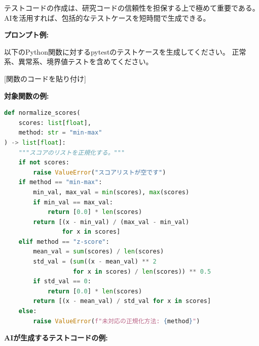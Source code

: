 テストコードの作成は、研究コードの信頼性を担保する上で極めて重要である。AIを活用すれば、包括的なテストケースを短時間で生成できる。

\textbf{プロンプト例:}

\begin{promptbox}
以下のPython関数に対するpytestのテストケースを生成してください。
正常系、異常系、境界値テストを含めてください。

{[}関数のコードを貼り付け]
\end{promptbox}

\textbf{対象関数の例:}

\begin{lstlisting}[language=Python]
def normalize_scores(
    scores: list[float],
    method: str = "min-max"
) -> list[float]:
    """スコアのリストを正規化する。"""
    if not scores:
        raise ValueError("スコアリストが空です")
    if method == "min-max":
        min_val, max_val = min(scores), max(scores)
        if min_val == max_val:
            return [0.0] * len(scores)
        return [(x - min_val) / (max_val - min_val)
                for x in scores]
    elif method == "z-score":
        mean_val = sum(scores) / len(scores)
        std_val = (sum((x - mean_val) ** 2
                   for x in scores) / len(scores)) ** 0.5
        if std_val == 0:
            return [0.0] * len(scores)
        return [(x - mean_val) / std_val for x in scores]
    else:
        raise ValueError(f"未対応の正規化方法: {method}")
\end{lstlisting}

\textbf{AIが生成するテストコードの例:}

